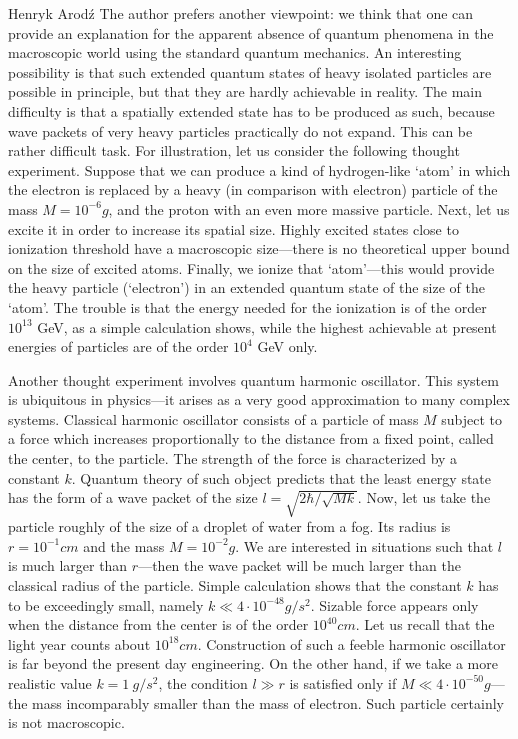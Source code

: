 \begin{artengenv}{Henryk Arod\'z}
The author prefers another viewpoint: we think that one can provide an explanation for the apparent absence of quantum phenomena in the macroscopic world using the standard quantum mechanics. An interesting possibility is that such extended quantum states of heavy isolated particles are possible in principle, but that they are hardly achievable in reality. The main difficulty is that a spatially extended state has to be produced as such, because wave packets of very heavy particles practically do not expand. This can be rather difficult task. For illustration, let us consider the following thought experiment. Suppose that we can produce a kind of hydrogen-like `atom' in which the electron is replaced by a heavy (in comparison with electron) particle of the mass $M= 10^{-6} g$, and the proton with an even more massive particle. Next, let us excite it in order to increase its spatial size. Highly excited states close to ionization threshold have a macroscopic size---there is no theoretical upper bound on the size of excited atoms. Finally, we ionize that `atom'---this would provide the heavy particle (`electron') in an extended quantum state of the size of the `atom'. The trouble is that the energy needed for the ionization is of the order $10^{13}$ GeV, as a simple calculation shows, while the highest achievable at present energies of particles are of the order $10^{4}$ GeV only.

Another thought experiment involves quantum harmonic oscillator. This system is ubiquitous in physics---it arises as a very good approximation to many complex systems. Classical harmonic oscillator consists of a particle of mass $M$ subject to a force which increases proportionally to the distance from a fixed point, called the center, to the particle. The strength of the force is characterized by a constant $k$. Quantum theory of such object predicts that the least energy state has the form of a wave packet of the size $l = \sqrt{2 \hbar/ \sqrt{M k}}$. Now, let us take the particle roughly of the size of a droplet of water from a fog. Its radius is $r= 10^{-1} cm$ and the mass $M= 10^{-2} g$. We are interested in situations such that $l$ is much larger than $r$---then the wave packet will be much larger than the classical radius of the particle. Simple calculation shows that the constant $k$ has to be exceedingly small, namely $k \ll 4\cdot 10^{-48} g/s^2$. Sizable force appears only when the distance from the center is of the order $10^{40} cm$. Let us recall that the light year counts about $10^{18} cm$. Construction of such a feeble harmonic oscillator is far beyond the present day engineering. On the other hand, if we take a more realistic value $k =1 \:g/s^2$, the condition $ l \gg r $ is satisfied only if $M \ll 4 \cdot 10^{-50} g$---the mass incomparably smaller than the mass of electron. Such particle certainly is not macroscopic. 






\end{artengenv}

